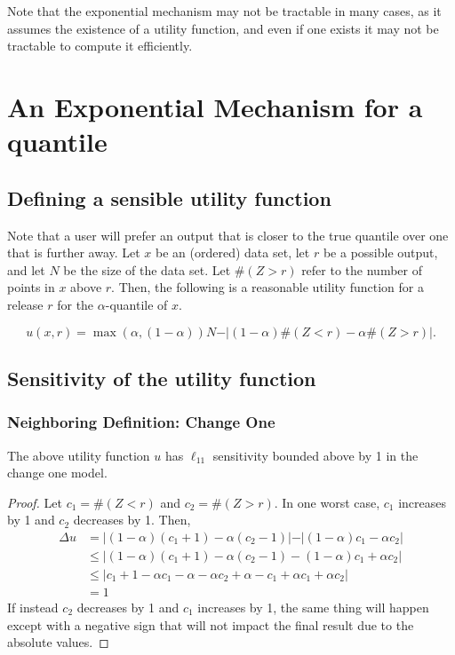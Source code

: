 \documentclass[11pt]{scrartcl} %
\begin{document}
Note that the exponential mechanism may not be tractable in many cases, as it assumes the existence of a utility function, and even if one exists it may not be tractable to compute it efficiently. 

\section{An Exponential Mechanism for a quantile}

\subsection{Defining a sensible utility function}

Note that a user will prefer an output that is closer to the true quantile over one that is further away. Let $x$ be an (ordered) data set, let $r$ be a possible output, and let $N$ be the size of the data set. Let $\#(Z>r)$ refer to the number of points in $x$ above $r$. Then, the following is a reasonable utility function for a release $r$ for the $\alpha$-quantile of $x$.

\begin{equation}
u(x,r) = \max(\alpha, (1-\alpha))N - \vert (1-\alpha)\#(Z<r) - \alpha\#(Z>r)\vert.
\end{equation} 

\subsection{Sensitivity of the utility function}

\subsubsection{Neighboring Definition: Change One}
\begin{lemma}
The above utility function $u$ has $\ell_11$ sensitivity bounded above by 1 in the change one model.
\end{lemma}

\begin{proof}
Let $c_1 = \#(Z<r)$ and $c_2 = \#(Z>r)$. In one worst case, $c_1$ increases by 1 and $c_2$ decreases by 1.
Then, 
\begin{align*}
\Delta u &= \vert (1-\alpha) (c_1 + 1) - \alpha (c_2-1) \vert - \vert (1-\alpha) c_1 - \alpha c_2 \vert  \\
 &\le \vert (1-\alpha) (c_1 + 1) - \alpha (c_2-1) - (1-\alpha) c_1 + \alpha c_2 \vert\\
 & \le \vert c_1 + 1 - \alpha c_1 - \alpha - \alpha c_2 + \alpha - c_1 + \alpha c_1 + \alpha c_2 \vert\\
&= 1
\end{align*}
If instead $c_2$ decreases by 1 and $c_1$ increases by 1, the same thing will happen except with a negative sign that will not impact the final result due to the absolute values.
\end{proof}
\end{document}
